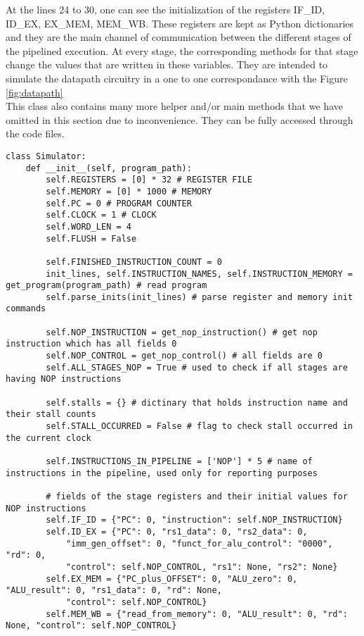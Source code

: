\noindent 
At the lines 24 to 30, one can see the initialization of the registers IF\_ID, ID\_EX, EX\_MEM, MEM\_WB. These registers are kept as Python dictionaries and they are the main channel of communication between the different stages of the pipelined execution. At every stage, the corresponding methods for that stage change the values that are written in these variables. They are intended to simulate the datapath circuitry in a one to one correspondance with the Figure \ref{fig:datapath}  
\\ 

\noindent This class also contains many more helper and/or main methods that we have omitted in this section due to inconvenience. They can be fully accessed through the code files.

\vspace{0.5 cm}
\begin{lstlisting}
class Simulator:
    def __init__(self, program_path):
        self.REGISTERS = [0] * 32 # REGISTER FILE
        self.MEMORY = [0] * 1000 # MEMORY
        self.PC = 0 # PROGRAM COUNTER
        self.CLOCK = 1 # CLOCK
        self.WORD_LEN = 4
        self.FLUSH = False

        self.FINISHED_INSTRUCTION_COUNT = 0
        init_lines, self.INSTRUCTION_NAMES, self.INSTRUCTION_MEMORY = get_program(program_path) # read program
        self.parse_inits(init_lines) # parse register and memory init commands
        
        self.NOP_INSTRUCTION = get_nop_instruction() # get nop instruction which has all fields 0
        self.NOP_CONTROL = get_nop_control() # all fields are 0
        self.ALL_STAGES_NOP = True # used to check if all stages are having NOP instructions

        self.stalls = {} # dictinary that holds instruction name and their stall counts
        self.STALL_OCCURRED = False # flag to check stall occurred in the current clock

        self.INSTRUCTIONS_IN_PIPELINE = ['NOP'] * 5 # name of instructions in the pipeline, used only for reporting purposes

        # fields of the stage registers and their initial values for NOP instructions
        self.IF_ID = {"PC": 0, "instruction": self.NOP_INSTRUCTION}
        self.ID_EX = {"PC": 0, "rs1_data": 0, "rs2_data": 0, 
            "imm_gen_offset": 0, "funct_for_alu_control": "0000", "rd": 0, 
            "control": self.NOP_CONTROL, "rs1": None, "rs2": None}
        self.EX_MEM = {"PC_plus_OFFSET": 0, "ALU_zero": 0, "ALU_result": 0, "rs1_data": 0, "rd": None,
            "control": self.NOP_CONTROL}
        self.MEM_WB = {"read_from_memory": 0, "ALU_result": 0, "rd": None, "control": self.NOP_CONTROL}
\end{lstlisting}


